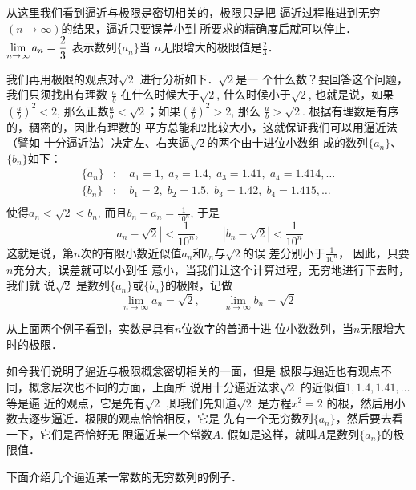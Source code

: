 从这里我们看到逼近与极限是密切相关的，极限只是把
逼近过程推进到无穷$(n\to\infty)$的结果，逼近只要误差小到
所要求的精确度后就可以停止．$\displaystyle\lim_{n\to\infty}a_n=\dfrac{2}{3}$
表示数列$\{a_n\}$当
$n$无限增大的极限值是$\frac{2}{3}$．

我们再用极限的观点对$\sqrt{2}$ 进行分析如下．$\sqrt{2}$是一
个什么数？要回答这个问题，我们只须找出有理数
$\frac{a}{b}$
在什么时候大于$\sqrt{2}$, 什么时候小于$\sqrt{2}$, 也就是说，如果
$\left(\frac{a}{b}\right)^2<2$, 那么正数$\frac{a}{b}<\sqrt{2}$；如果$\left(\frac{a}{b}\right)^2>2$, 那么
$\frac{a}{b}>\sqrt{2}$. 根据有理数是有序的，稠密的，因此有理数的
平方总能和2比较大小，这就保证我们可以用逼近法（譬如
十分逼近法）决定左、右夹逼$\sqrt{2}$的两个由十进位小数组
成的数列$\{a_n\}$、$\{b_n\}$如下：
\[\begin{split}
    \{a_n\}&:\quad a_1=1,\; a_2=1.4,\; a_3=1.41,\; a_4=1.414,\ldots\\
    \{b_n\}&:\quad b_1=2,\; b_2=1.5,\; b_3=1.42,\; b_4=1.415,\ldots\\
\end{split}\]
使得$a_n<\sqrt{2}<b_n$, 而且$b_n-a_n=\frac{1}{10^n}$,
于是
\[|a_n-\sqrt{2}|<\frac{1}{10^n},\qquad |b_n-\sqrt{2}|<\frac{1}{10^n} \]
这就是说，第$n$次的有限小数近似值$a_n$和$b_n$与$\sqrt{2}$的误
差分别小于$\frac{1}{10^n}$，
因此，只要$n$充分大，误差就可以小到任
意小，当我们让这个计算过程，无穷地进行下去时，我们就
说$\sqrt{2}$ 是数列$\{a_n\}$或$\{b_n\}$的极限，记做
\[\lim_{n\to\infty}a_n=\sqrt{2},\qquad \lim_{n\to\infty}b_n=\sqrt{2}\]

从上面两个例子看到，实数是具有$n$位数字的普通十进
位小数数列，当$n$无限增大时的极限．

如今我们说明了逼近与极限概念密切相关的一面，但是
极限与逼近也有观点不同，概念层次也不同的方面，上面所
说用十分逼近法求$\sqrt{2}$ 的近似值$1,1.4,1.41,\ldots$等是逼
近的观点，它是先有$\sqrt{2}$ ,即我们先知道$\sqrt{2}$  是方程$x^2=2$
的根，然后用小数去逐步逼近．极限的观点恰恰相反，它是
先有一个无穷数列$\{a_n\}$，然后要去看一下，它们是否恰好无
限逼近某一个常数$A$. 假如是这样，就叫$A$是数列$\{a_n\}$的极
限值．

下面介绍几个逼近某一常数的无穷数列的例子．

